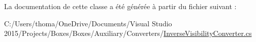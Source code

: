 La documentation de cette classe a été générée à partir du fichier suivant \+:\begin{DoxyCompactItemize}
\item 
C\+:/\+Users/thoma/\+One\+Drive/\+Documents/\+Visual Studio 2015/\+Projects/\+Boxes/\+Boxes/\+Auxiliary/\+Converters/\hyperlink{_inverse_visibility_converter_8cs}{Inverse\+Visibility\+Converter.\+cs}\end{DoxyCompactItemize}
